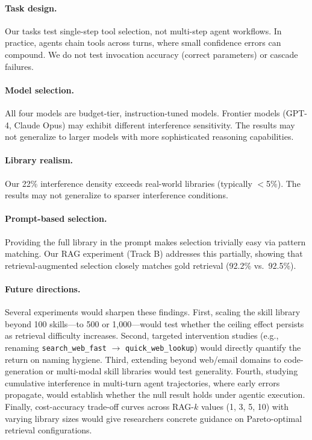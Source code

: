 \documentclass[11pt]{article}
\begin{document}
\paragraph{Task design.} Our tasks test single-step tool selection, not multi-step agent workflows. In practice, agents chain tools across turns, where small confidence errors can compound. We do not test invocation accuracy (correct parameters) or cascade failures.

\paragraph{Model selection.} All four models are budget-tier, instruction-tuned models. Frontier models (GPT-4, Claude Opus) may exhibit different interference sensitivity. The results may not generalize to larger models with more sophisticated reasoning capabilities.

\paragraph{Library realism.} Our 22\% interference density exceeds real-world libraries (typically $<$5\%). The results may not generalize to sparser interference conditions.

\paragraph{Prompt-based selection.} Providing the full library in the prompt makes selection trivially easy via pattern matching. Our RAG experiment (Track B) addresses this partially, showing that retrieval-augmented selection closely matches gold retrieval (92.2\% vs.\ 92.5\%).

\paragraph{Future directions.}
Several experiments would sharpen these findings. First, scaling the skill library beyond 100 skills---to 500 or 1,000---would test whether the ceiling effect persists as retrieval difficulty increases. Second, targeted intervention studies (e.g., renaming \texttt{search\_web\_fast} $\rightarrow$ \texttt{quick\_web\_lookup}) would directly quantify the return on naming hygiene. Third, extending beyond web/email domains to code-generation or multi-modal skill libraries would test generality. Fourth, studying cumulative interference in multi-turn agent trajectories, where early errors propagate, would establish whether the null result holds under agentic execution. Finally, cost-accuracy trade-off curves across RAG-$k$ values (1, 3, 5, 10) with varying library sizes would give researchers concrete guidance on Pareto-optimal retrieval configurations.
\end{document}

